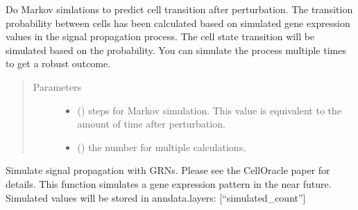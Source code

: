 \documentclass[letterpaper,10pt,english]{sphinxmanual}
\begin{document}
\begin{fulllineitems}
\begin{fulllineitems}
\label{\detokenize{modules/celloracle:celloracle.Oracle.run_markov_chain_simulation}}
Do Markov simlations to predict cell transition after perturbation.
The transition probability between cells has been calculated
based on simulated gene expression values in the signal propagation process.
The cell state transition will be simulated based on the probability.
You can simulate the process multiple times to get a robust outcome.
\begin{quote}\begin{description}
\item[{Parameters}] \leavevmode\begin{itemize}
\item {} 
 () \textendash{} steps for Markov simulation. This value is equivalent to the amount of time after perturbation.

\item {} 
 () \textendash{} the number for multiple calculations.

\end{itemize}

\end{description}\end{quote}

\end{fulllineitems}


\begin{fulllineitems}
\label{\detokenize{modules/celloracle:celloracle.Oracle.simulate_shift}}
Simulate signal propagation with GRNs. Please see the CellOracle paper for details.
This function simulates a gene expression pattern in the near future.
Simulated values will be stored in anndata.layers: {[}“simulated\_count”{]}


\end{fulllineitems}
\end{fulllineitems}
\end{document}
